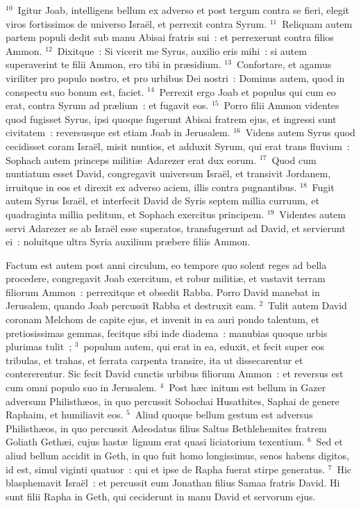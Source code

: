 ${}^{10}$~Igitur Joab, intelligens bellum ex adverso et post tergum contra se fieri, elegit viros fortissimos de universo Isra\"el, et perrexit contra Syrum.
${}^{11}$~Reliquam autem partem populi dedit sub manu Abisai fratris sui~: et perrexerunt contra filios Ammon.
${}^{12}$~Dixitque~: Si vicerit me Syrus, auxilio eris mihi~: si autem superaverint te filii Ammon, ero tibi in pr\ae sidium.
${}^{13}$~Confortare, et agamus viriliter pro populo nostro, et pro urbibus Dei nostri~: Dominus autem, quod in conspectu suo bonum est, faciet.
${}^{14}$~Perrexit ergo Joab et populus qui cum eo erat, contra Syrum ad pr\ae lium~: et fugavit eos.
${}^{15}$~Porro filii Ammon videntes quod fugisset Syrus, ipsi quoque fugerunt Abisai fratrem ejus, et ingressi sunt civitatem~: reversusque est etiam Joab in Jerusalem.
${}^{16}$~Videns autem Syrus quod cecidisset coram Isra\"el, misit nuntios, et adduxit Syrum, qui erat trans fluvium~: Sophach autem princeps militi\ae\ Adarezer erat dux eorum.
${}^{17}$~Quod cum nuntiatum esset David, congregavit universum Isra\"el, et transivit Jordanem, irruitque in eos et direxit ex adverso aciem, illis contra pugnantibus.
${}^{18}$~Fugit autem Syrus Isra\"el, et interfecit David de Syris septem millia curruum, et quadraginta millia peditum, et Sophach exercitus principem.
${}^{19}$~Videntes autem servi Adarezer se ab Isra\"el esse superatos, transfugerunt ad David, et servierunt ei~: noluitque ultra Syria auxilium pr\ae bere filiis Ammon.

\lettrine[lines=3,image=true,loversize=0.05,lraise=-0.03]{F}{}actum est autem post anni circulum, eo tempore quo solent reges ad bella procedere, congregavit Joab exercitum, et robur militi\ae , et vastavit terram filiorum Ammon~: perrexitque et obsedit Rabba. Porro David manebat in Jerusalem, quando Joab percussit Rabba et destruxit eam.
${}^{2}$~Tulit autem David coronam Melchom de capite ejus, et invenit in ea auri pondo talentum, et pretiosissimas gemmas, fecitque sibi inde diadema~: manubias quoque urbis plurimas tulit~;
${}^{3}$~populum autem, qui erat in ea, eduxit, et fecit super eos tribulas, et trahas, et ferrata carpenta transire, ita ut dissecarentur et contererentur. Sic fecit David cunctis urbibus filiorum Ammon~: et reversus est cum omni populo suo in Jerusalem.
${}^{4}$~Post h\ae c initum est bellum in Gazer adversum Philisth\ae os, in quo percussit Sobochai Husathites, Saphai de genere Raphaim, et humiliavit eos.
${}^{5}$~Aliud quoque bellum gestum est adversus Philisth\ae os, in quo percussit Adeodatus filius Saltus Bethlehemites fratrem Goliath Geth\ae i, cujus hast\ae\ lignum erat quasi liciatorium texentium.
${}^{6}$~Sed et aliud bellum accidit in Geth, in quo fuit homo longissimus, senos habens digitos, id est, simul viginti quatuor~: qui et ipse de Rapha fuerat stirpe generatus.
${}^{7}$~Hic blasphemavit Isra\"el~: et percussit eum Jonathan filius Samaa fratris David. Hi sunt filii Rapha in Geth, qui ceciderunt in manu David et servorum ejus.

